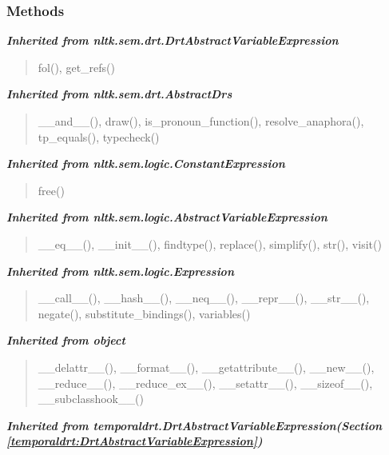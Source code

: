   \subsubsection{Methods}


\large{\textbf{\textit{Inherited from nltk.sem.drt.DrtAbstractVariableExpression}}}

\begin{quote}
fol(), get\_refs()
\end{quote}

\large{\textbf{\textit{Inherited from nltk.sem.drt.AbstractDrs}}}

\begin{quote}
\_\_and\_\_(), draw(), is\_pronoun\_function(), resolve\_anaphora(), tp\_equals(), typecheck()
\end{quote}

\large{\textbf{\textit{Inherited from nltk.sem.logic.ConstantExpression}}}

\begin{quote}
free()
\end{quote}

\large{\textbf{\textit{Inherited from nltk.sem.logic.AbstractVariableExpression}}}

\begin{quote}
\_\_eq\_\_(), \_\_init\_\_(), findtype(), replace(), simplify(), str(), visit()
\end{quote}

\large{\textbf{\textit{Inherited from nltk.sem.logic.Expression}}}

\begin{quote}
\_\_call\_\_(), \_\_hash\_\_(), \_\_neq\_\_(), \_\_repr\_\_(), \_\_str\_\_(), negate(), substitute\_bindings(), variables()
\end{quote}

\large{\textbf{\textit{Inherited from object}}}

\begin{quote}
\_\_delattr\_\_(), \_\_format\_\_(), \_\_getattribute\_\_(), \_\_new\_\_(), \_\_reduce\_\_(), \_\_reduce\_ex\_\_(), \_\_setattr\_\_(), \_\_sizeof\_\_(), \_\_subclasshook\_\_()
\end{quote}

\large{\textbf{\textit{Inherited from temporaldrt.DrtAbstractVariableExpression\textit{(Section \ref{temporaldrt:DrtAbstractVariableExpression})}}}}

    \vspace{0.5ex}

